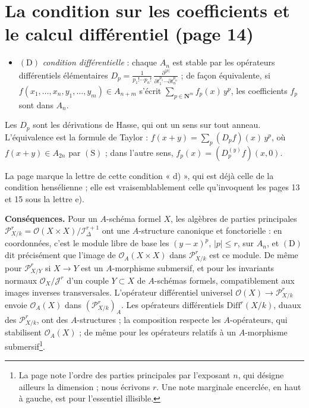 \documentclass[11pt,a4paper]{article}
\begin{document}
\section*{La condition sur les coefficients et le calcul différentiel (page 14)}

\begin{itemize}
  \item $(\mathrm{D})$ \emph{condition différentielle} : chaque $A_n$ est stable
    par les opérateurs différentiels élémentaires
    $D_p = \frac{1}{p_1! \cdots p_n!}\, \frac{\partial^{|p|}}{\partial t_1^{p_1}
    \cdots \partial t_n^{p_n}}$ ; de façon équivalente, si
    $f(x_1, \ldots, x_n, y_1, \ldots, y_m) \in A_{n+m}$ s'écrit
    $\sum_{p \in \mathbf{N}^m} f_p(x)\, y^p$, les coefficients $f_p$ sont dans $A_n$.
\end{itemize}

Les $D_p$ sont les dérivations de Hasse, qui ont un sens sur tout anneau.
L'équivalence est la formule de Taylor : $f(x + y) = \sum_p (D_p f)(x)\, y^p$,
où $f(x+y) \in A_{2n}$ par $(\mathrm{S})$ ; dans l'autre sens, $f_p(x) =
(D^{(y)}_p f)(x, 0)$.

La page marque la lettre de cette condition « d) », qui est déjà celle de la
condition hensélienne ; elle est vraisemblablement celle qu'invoquent les pages
13 et 15 sous la lettre e).

\textbf{Conséquences.} Pour un $A$-schéma formel $X$, les algèbres de parties
principales $\mathcal{P}^r_{X/k} = \mathcal{O}(X \times X)/\mathcal{I}_\Delta^{r+1}$ ont
une $A$-structure canonique et fonctorielle : en coordonnées, c'est le module
libre de base les $(y - x)^p$, $|p| \leq r$, sur $A_n$, et $(\mathrm{D})$ dit
précisément que l'image de $\mathcal{O}_A(X \times X)$ dans $\mathcal{P}^r_{X/k}$ est ce
module. De même pour $\mathcal{P}^r_{X/Y}$ si $X \to Y$ est un $A$-morphisme
submersif, et pour les invariants normaux $\mathcal{O}_X/\mathcal{J}^r$ d'un couple
$Y \subset X$ de $A$-schémas formels, compatiblement aux images inverses
transversales. L'opérateur différentiel universel
$\mathcal{O}(X) \to \mathcal{P}^r_{X/k}$ envoie $\mathcal{O}_A(X)$ dans
$(\mathcal{P}^r_{X/k})_A$. Les opérateurs différentiels $\mathrm{Diff}^r(X/k)$, duaux
des $\mathcal{P}^r_{X/k}$, ont des $A$-structures ; la composition respecte les
$A$-opérateurs, qui stabilisent $\mathcal{O}_A(X)$ ; de même pour les opérateurs
relatifs à un $A$-morphisme submersif\footnote{La page note l'ordre des
parties principales par l'exposant $n$, qui désigne ailleurs la dimension ;
nous écrivons $r$. Une note marginale encerclée, en haut à gauche, est pour
l'essentiel illisible.}.
\end{document}
